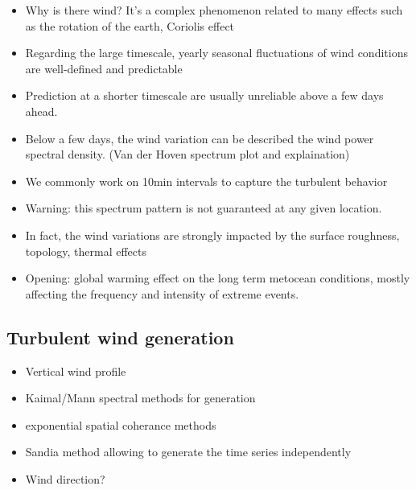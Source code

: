 \begin{itemize}
    \item Why is there wind? It's a complex phenomenon related to many effects such as the rotation of the earth, Coriolis effect 
    \item Regarding the large timescale, yearly seasonal fluctuations of wind conditions are well-defined and predictable
    \item Prediction at a shorter timescale are usually unreliable above a few days ahead. 
    \item Below a few days, the wind variation can be described the wind power spectral density. (Van der Hoven spectrum plot and explaination)
    \item We commonly work on 10min intervals to capture the turbulent behavior
    \item Warning: this spectrum pattern is not guaranteed at any given location. 
    \item In fact, the wind variations are strongly impacted by the surface roughness, topology, thermal effects 
    \item Opening: global warming effect on the long term metocean conditions, mostly affecting the frequency and intensity of extreme events.
\end{itemize}






\subsection{Turbulent wind generation}

\begin{itemize}
    \item Vertical wind profile
    \item Kaimal/Mann spectral methods for generation
    \item exponential spatial coherance methods
    \item Sandia method allowing to generate the time series independently
    \item Wind direction? 
\end{itemize}



